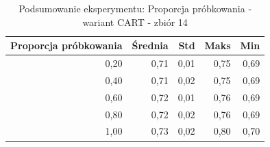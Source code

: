 \begin{table}[htbp]
\centering
\small
\setlength{\tabcolsep}{6pt}
\renewcommand{\arraystretch}{1.2}
\caption{Podsumowanie eksperymentu: Proporcja próbkowania - wariant CART - zbiór 14}
\label{tab:CART_sample_ratio_14}
\begin{tabular}{r|r|r|r|r}
\toprule
Proporcja próbkowania & Średnia & Std & Maks & Min \\
\hline
0,20 & 0,71 & 0,01 & 0,75 & 0,69 \\
0,40 & 0,71 & 0,02 & 0,75 & 0,69 \\
0,60 & 0,72 & 0,01 & 0,76 & 0,69 \\
0,80 & 0,72 & 0,02 & 0,76 & 0,69 \\
1,00 & 0,73 & 0,02 & 0,80 & 0,70 \\
\bottomrule
\end{tabular}
\end{table}